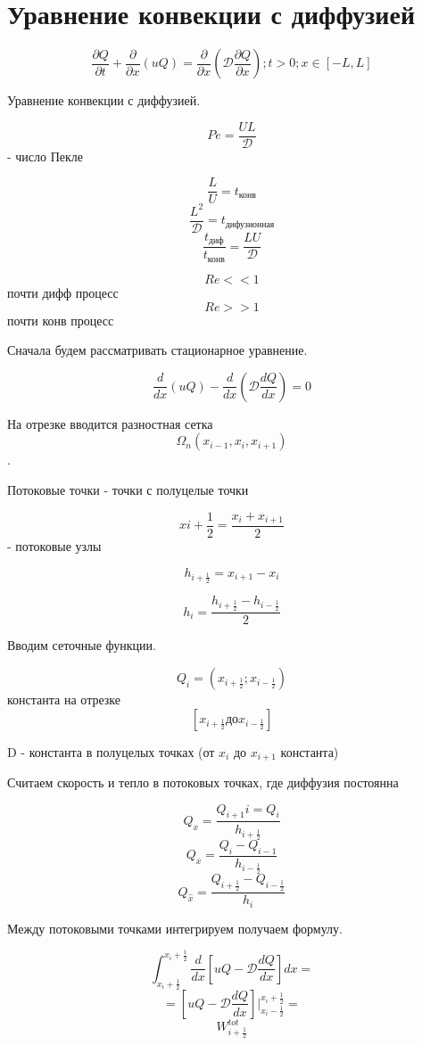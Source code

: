\documentclass[14pt]{extarticle}
\begin{document}
\section{Уравнение конвекции с диффузией}

\[ \frac{\partial Q}{\partial t} +\frac{\partial }{\partial x} (u Q) = \frac{\partial }{\partial x} (\mathcal{D} \frac{\partial Q}{\partial x}); t>0; x \in [-L, L] \]

Уравнение конвекции с диффузией.

\[ Pe = \frac{UL}{\mathcal{D}} \] - число Пекле

\[ \frac{L}{U} = t_{\textrm{конв}} \]
\[ \frac{L^2}{\mathcal{D}} = t_{\textrm{дифузионная}} \]
\[ \frac{t_{\textrm{диф}}}{t_{\textrm{конв}}} = \frac{L U}{\mathcal{D}} \]

\[ Re << 1 \] почти дифф процесс
\[ Re >> 1 \] почти конв процесс

Сначала будем рассматривать стационарное уравнение. 

\[ \frac{d}{dx}(uQ) - \frac{d}{dx} (\mathcal{D} \frac{d Q}{d x}) = 0 \]

На отрезке вводится разностная сетка \[ \Omega_n (x_{i-1}, x_{i}, x_{i+1})\].

Потоковые точки - точки с полуцелые точки

\[ x{i+\frac{1}{2}} = \frac{x_i + x_{i+1}}{2} \] - потоковые узлы

\[ h_{i+\frac{1}{2}} = x_{i+1} - x_{i} \]

\[ h_{i} = \frac{h_{i+\frac{1}{2}} - h_{i-\frac{1}{2}}}{2} \]

Вводим сеточные функции.

\[ Q_i = (x_{i+\frac{1}{2}}; x_{i-\frac{1}{2}}) \]
константа на отрезке
\[ [x_{i+\frac{1}{2}} \textrm{до} x_{i-\frac{1}{2}}] \]

D - константа в полуцелых точках (от $ x_i $ до  $ x_{i+1} $ константа)

Считаем скорость и тепло в потоковых точках, где диффузия постоянна

\[ Q_x = \frac{Q_{i+1}i = Q_i}{h_{i+\frac{1}{2}}} \]
\[ Q_{\overline{x}} = \frac{Q_{i} - Q_{i-1}}{h_{i-\frac{1}{2}}} \]
\[ Q_{\widehat{x}} = \frac{Q_{i+\frac{1}{2}} - Q_{i-\frac{1}{2}}}{h_{i}} \]

Между потоковыми точками интегрируем получаем формулу.

\[ \int_{x_{i}+\frac{1}{2}}^{x_{i}+\frac{1}{2}} \frac{d}{d x} [uQ - \mathcal{D}\frac{dQ}{dx}]dx = \]
\[ = [uQ - \mathcal{D}\frac{dQ}{dx}]|_{x_{i} - \frac{1}{2}}^{x_i + \frac{1}{2} } = \]
\[ W^{tot}_{i + \frac{1}{2}} \]
\end{document}
